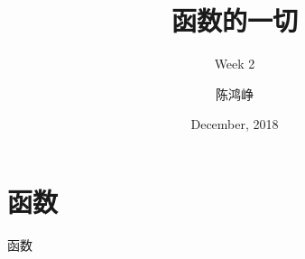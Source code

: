 \documentclass[UTF8]{ctexbeamer}
\title{函数的一切}
\subtitle{Week 2}
\author[chhzh123]{陈鸿峥}
\institute[]{\small\url{https://github.com/chhzh123/Notes-of-Math/blob/master/Mathematical_analysis/main.pdf}}
\date[Dec, 2018]{December, 2018}
\begin{document}
\begin{frame}
\titlepage
\end{frame}

\begin{frame}
\tableofcontents[subsectionstyle=show]
\end{frame}

\section{函数}
\begin{frame}
\sectionpage
\end{frame}

\begin{frame}{函数}

\end{frame}
\end{document}

